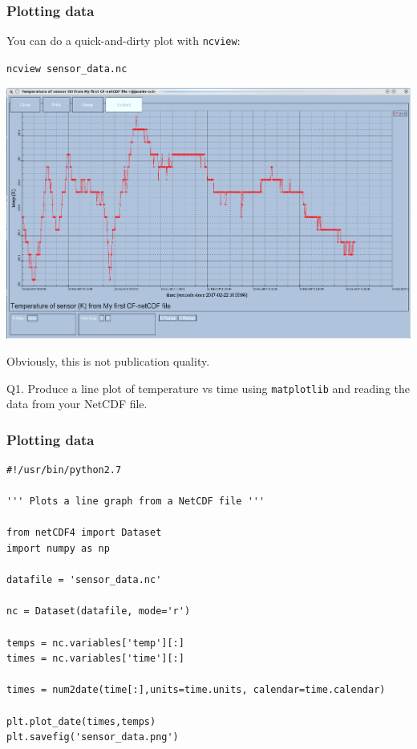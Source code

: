 \documentclass[aspectratio=1610,9pt]{beamer} %
\begin{document}
\begin{frame}
\frametitle{Plotting data}

You can do a quick-and-dirty plot with \texttt{ncview}:

\texttt{ncview sensor\_data.nc}

\includegraphics[width=\textwidth]{sensor-data-ncview.png}

Obviously, this is not publication quality.


Q1. Produce a line plot of temperature vs time using \texttt{matplotlib}
and reading the data from your NetCDF file.

\end{frame}
\begin{frame}[fragile]
\frametitle{Plotting data}

\begin{verbatim}
#!/usr/bin/python2.7

''' Plots a line graph from a NetCDF file '''

from netCDF4 import Dataset
import numpy as np

datafile = 'sensor_data.nc'

nc = Dataset(datafile, mode='r')

temps = nc.variables['temp'][:]
times = nc.variables['time'][:]

times = num2date(time[:],units=time.units, calendar=time.calendar)

plt.plot_date(times,temps)
plt.savefig('sensor_data.png')
\end{verbatim}

\end{frame}
\end{document}
